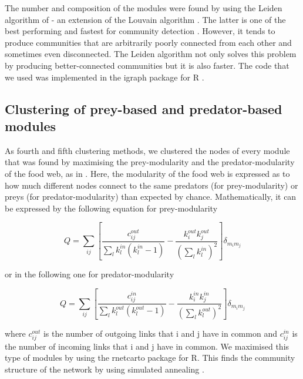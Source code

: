 \documentclass[twocolumn]{article}
\begin{document}
		The number and composition of the modules were found by using the Leiden algorithm of \citet{Traag2019} - an extension of the Louvain algorithm \citep{Blondel2008}. The latter is one of the best performing and fastest for community detection \citep{Traag2019}. However, it tends to produce communities that are arbitrarily poorly connected from each other and sometimes even disconnected. The Leiden algorithm not only solves this problem by producing better-connected communities but it is also faster. The code that we used was implemented in the igraph package \citep{Csardi2006} for R \citep{RDevelopmentCoreTeam2011}.

	\subsection*{Clustering of prey-based and predator-based modules}

		As fourth and fifth clustering methods, we clustered the nodes of every module that was found by maximising the prey-modularity and the predator-modularity of the food web, as in \citet{Guimera2010}. Here, the modularity of the food web is expressed as to how much different nodes connect to the same predators (for prey-modularity) or preys (for predator-modularity) than expected by chance. Mathematically, it can be expressed by the following equation \citep{Guimera2007} for prey-modularity

						\begin{equation}
							Q=\sum_{ij}{\left[\frac{c_{ij}^{out}}{\sum_{l}{k_l^{in}\left(k_l^{in}-1\right)}}-\frac{k_i^{out}k_j^{out}}{\left(\sum_{l} k_l^{in}\right)^2}\right]\delta_{m_im_j}}
						\end{equation}

		or in the following one for predator-modularity

						\begin{equation}
							Q=\sum_{ij}{\left[\frac{c_{ij}^{in}}{\sum_{l}{k_l^{out}\left(k_l^{out}-1\right)}}-\frac{k_i^{in}k_j^{in}}{\left(\sum_{l} k_l^{out}\right)^2}\right]\delta_{m_im_j}}
						\end{equation}

		\noindent where $c_{ij}^{out}$ is the number of outgoing links that i and j have in common and $c_{ij}^{in}$ is the number of incoming links that i and j have in common.
		We maximised this type of modules by using the rnetcarto package \citep{Doulcier2015} for R. This finds the community structure of the network by using simulated annealing \citep{Kirkpatrick1983}.  %
\end{document}
